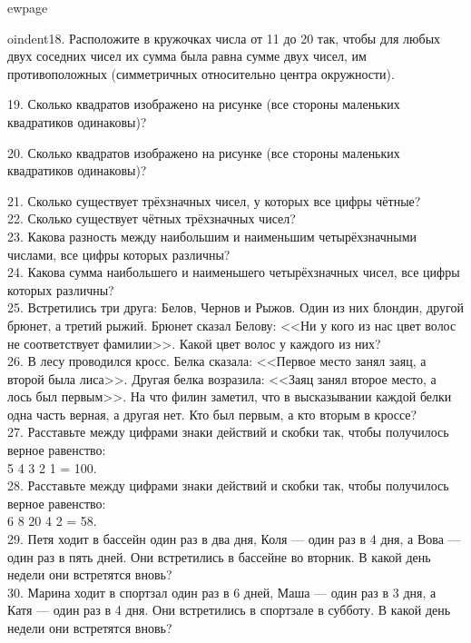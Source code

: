 ewpage

oindent18. Расположите в кружочках числа от 11 до 20 так, чтобы для любых двух соседних чисел их сумма была равна сумме двух чисел, им противоположных (симметричных относительно центра окружности).
\begin{center}
\begin{figure}[ht!]
\end{figure}
\end{center}
19. Сколько квадратов изображено на рисунке (все стороны маленьких квадратиков одинаковы)?
\begin{center}
\begin{figure}[ht!]
\end{figure}
\end{center}
20. Сколько квадратов изображено на рисунке (все стороны маленьких квадратиков одинаковы)?
\begin{center}
\begin{figure}[ht!]
\end{figure}
\end{center}
21. Сколько существует трёхзначных чисел, у которых все цифры чётные?\\
22. Сколько существует чётных трёхзначных чисел?\\
23. Какова разность между наибольшим и наименьшим четырёхзначными числами, все цифры которых различны?\\
24. Какова сумма наибольшего и наименьшего четырёхзначных чисел, все цифры которых различны?\\
25. Встретились три друга: Белов, Чернов и Рыжов. Один из них блондин, другой брюнет, а третий рыжий. Брюнет сказал Белову: <<Ни у кого из нас цвет волос не соответствует фамилии>>. Какой цвет волос у каждого из них?\\
26. В лесу проводился кросс. Белка сказала: <<Первое место занял заяц, а второй была лиса>>. Другая белка возразила: <<Заяц занял второе место, а лось был первым>>. На что филин заметил, что в высказывании каждой белки одна часть верная, а другая нет. Кто был первым, а кто вторым в кроссе?\\
27. Расставьте между цифрами знаки действий и скобки так, чтобы получилось верное равенство:\\ 5 4 3 2 1 = 100.\\
28. Расставьте между цифрами знаки действий и скобки так, чтобы получилось верное равенство:\\ 6 8 20 4 2 = 58.\\
29. Петя ходит в бассейн один раз в два дня, Коля --- один раз в 4 дня, а Вова --- один раз в пять дней. Они встретились в бассейне во вторник. В какой день недели они встретятся вновь?\\
30. Марина ходит в спортзал один раз в 6 дней, Маша --- один раз в 3 дня, а Катя --- один раз в 4 дня. Они встретились в спортзале в субботу. В какой день недели они встретятся вновь?

